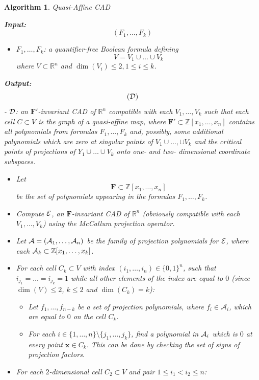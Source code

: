 \documentclass[
]{book}
\providecommand{\tightlist}{%
  \setlength{\itemsep}{0pt}\setlength{\parskip}{0pt}}
\newtheorem{algorithm}{Algorithm}
\theoremstyle{definition}
\theoremstyle{definition}
\theoremstyle{definition}
\theoremstyle{definition}
\theoremstyle{remark}
\begin{document}
\begin{algorithm}Quasi-Affine CAD

\textbf{Input:}
\[(F_1,\ldots,F_k)\]

\begin{itemize}
\tightlist
\item
  \(F_1,\ldots,F_k\): a quantifier-free Boolean formula defining
  \[
    V = V_1 \cup \ldots \cup V_k
    \]
  where \(V \subset \mathbb{R}^n\) and \(\dim(V_i) \le 2, 1 \le i \le k\).
\end{itemize}

\textbf{Output:}
\[
({\cal D})
\]
- \(\cal D\): an \(\mathbf{F'}\)-invariant CAD of \(\mathbb{R}^n\) compatible with each \(V_1,\ldots,V_k\) such that each cell \(C \subset V\) is the graph of a quasi-affine map, where \(\mathbf{F'} \subset \mathbb{Z}[x_1,\ldots,x_n]\) contains all polynomials from formulas \(F_1,\ldots,F_k\) and, possibly, some additional polynomials which are zero at singular points of \(V_1\cup \ldots, \cup V_k\) and the critical points of projections of \(Y_1 \cup \ldots \cup V_k\) onto one- and two- dimensional coordinate subspaces.

\begin{itemize}
\item
  Let \[
  \mathbf{F} \subset \mathbb{Z}[x_1,\ldots,x_n]
  \]
  be the set of polynomials appearing in the formulas \(F_1,\ldots,F_k\).
\item
  Compute \(\cal E\), an \(\mathbf{F}\)-invariant CAD of \(\mathbb{R}^n\) (obviously compatible with each \(V_1,\ldots,V_k\)) using the McCallum projection operator.
\item
  Let \({\cal A} = ({\cal A}_1,\ldots,{\cal A}_{n})\) be the family of projection polynomials for \(\cal E\), where each \({\cal A}_k \subset \mathbb{Z}[x_1,\ldots,x_k]\).
\item
  For each cell \(C_k \subset V\) with index \((i_1,\ldots,i_n) \in \{0,1\}^n\), such that \(i_{j_1} = \ldots = i_{j_k} = 1\) while all other elements of the index are equal to \(0\) (since \(\dim(V) \le 2\), \(k \le 2\) and \(\dim(C_k) = k\)):

  \begin{itemize}
  \item
    Let \(f_1,\ldots,f_{n-k}\) be a set of projection polynomials, where \(f_i \in \mathcal{A}_i\), which are equal to \(0\) on the cell \(C_k\).
  \item
    For each \(i \in \{1,\ldots,n\} \setminus \{j_1,\ldots,j_k\}\), find a polynomial in \({\cal A}_i\) which is \(0\) at every point \(\mathbf{x} \in C_k\). This can be done by checking the set of signs of projection factors.
  \end{itemize}
\item
  For each \(2\)-dimensional cell \(C_2 \subset V\) and pair \(1 \le i_1 < i_2 \le n\):


\end{itemize}
\end{algorithm}
\end{document}
